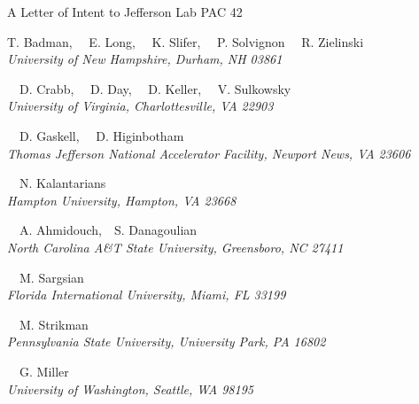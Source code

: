 \begin{center}
A Letter of Intent to Jefferson Lab PAC 42

\vspace{1.5cm}

\setcounter{footnote}{\SPOKES}
%
{T. Badman,
~~E. Long,\setcounter{footnote}{\SPOKES}
\setcounter{footnote}{\SPOKES}\footnotemark {}
\setcounter{footnote}{\CONTACT}\footnotemark{}
~~K. Slifer,\setcounter{footnote}{\SPOKES}\footnotemark
~~P. Solvignon\setcounter{footnote}{\SPOKES}\footnotemark
~~R. Zielinski
}\\
\ls
{\normalsize\it{University of New Hampshire, Durham, NH 03861}}

\vspace{10px}

{~~D. Crabb,
~~D. Day,\setcounter{footnote}{\SPOKES}\footnotemark
~~D. Keller,\setcounter{footnote}{\SPOKES}\footnotemark
~~V. Sulkowsky}\\
\ls
{\normalsize\it{University of Virginia, Charlottesville, VA 22903}}

\vspace{10px}

{~~D. Gaskell,
~~D. Higinbotham\setcounter{footnote}{\SPOKES}\footnotemark}\\
\ls
{\normalsize\it{Thomas Jefferson National Accelerator Facility, Newport News, VA 23606}}

\vspace{10px}

{~~N. Kalantarians}\\
\ls
{\normalsize\it{Hampton University, Hampton, VA 23668}}

\vspace{10px}

{~~A. Ahmidouch,~~S. Danagoulian}\\
\ls
{\normalsize\it{North Carolina A\&T State University, Greensboro, NC 27411}}

\vspace{10px}

{~~M. Sargsian}\\
\ls
{\normalsize\it{Florida International University, Miami, FL 33199}}

\vspace{10px}

{~~M. Strikman}\\
\ls
{\normalsize\it{Pennsylvania State University, University Park, PA 16802}}

\vspace{10px}

{~~G. Miller}\\
\ls
{\normalsize\it{University of Washington, Seattle, WA 98195}}
\ks
%

\end{center}


\setcounter{footnote}{0}
